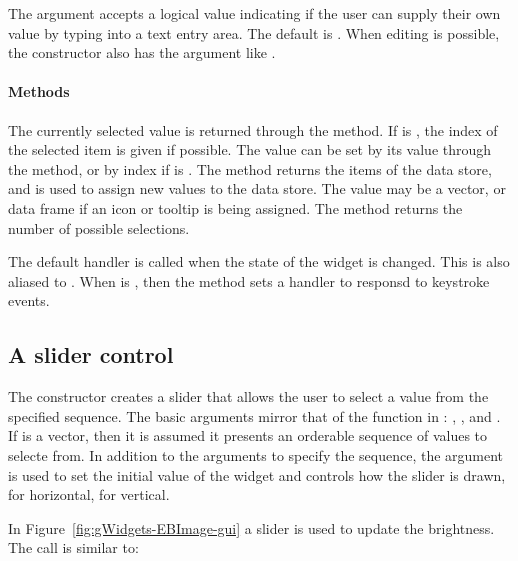 The argument  accepts a logical value
indicating if the user can supply their own value by typing into a
text entry area. The default is . When editing is
possible, the constructor also has the
 argument like .

\paragraph{Methods}
The currently selected value is returned through the
 method. If  is , the
index of the selected item is given if possible. The value can be set
by its value through the  method, or
by index if  is . The \method{[}{gcombobox}
method returns the items of the data store, and
\method{[\ASSIGN}{gcombobox} is used to assign new values to the data
store. The value may be a vector, or data frame if an icon or tooltip
is being assigned. The  method returns the
number of possible selections.

The default handler is called when the state of the widget is
changed. This is also aliased to
. When  is
, then the  method
sets a handler to responsd to keystroke events.



\subsection{A slider control}
\label{sec:gWidgets-slider-control}

The  constructor creates a slider that allows the
user to select a value from the specified sequence.  The basic
arguments mirror that of the  function in \R:
, , and
.  If  is a vector, then it is
assumed it presents an orderable sequence of values to selecte from.
In addition to the arguments to specify the sequence, the argument
 is used to set the initial value of the
widget and  controls how the slider is
drawn,  for horizontal,  for vertical.

In Figure~\ref{fig:gWidgets-EBImage-gui} a slider is used to update
the brightness. The call is similar to:
\begin{Schunk}
\end{Schunk}

